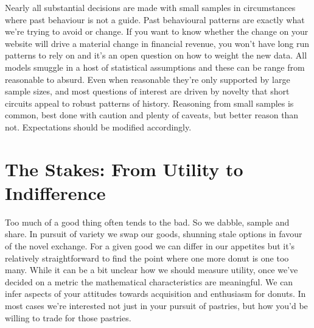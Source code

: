\documentclass{tufte-handout}
\begin{document}
\noindent Nearly all substantial decisions are made with small samples in circumstances where past behaviour is not a guide. Past behavioural patterns are exactly what we're trying to avoid or change. If you want to know whether the change on your website will drive a material change in financial revenue, you won't have long run patterns to rely on and it's an open question on how to weight the new data. All models smuggle in a host of statistical assumptions and these can be range from reasonable to absurd. Even when reasonable they're only supported by large sample sizes, and most questions of interest are driven by novelty that short circuits appeal to robust patterns of history. Reasoning from small samples is common, best done with caution and plenty of caveats, but better reason than not. Expectations should be modified accordingly.

\section{\textbf{The Stakes: From Utility to Indifference}}
\label{sec:Utility}
Too much of a good thing often tends to the bad. So we dabble, sample and share. In pursuit of variety we swap our goods, shunning stale options in favour of the novel exchange.  For a given good we can differ in our appetites but it's relatively straightforward to find the point where one more donut is one too many. While it can be a bit unclear how we should measure utility, once we've decided on a metric the mathematical characteristics are meaningful. We can infer aspects of your attitudes towards acquisition and enthusiasm for donuts. In most cases we're interested not just in your pursuit of pastries, but how you'd be willing to trade for those pastries. \linebreak
\end{document}
